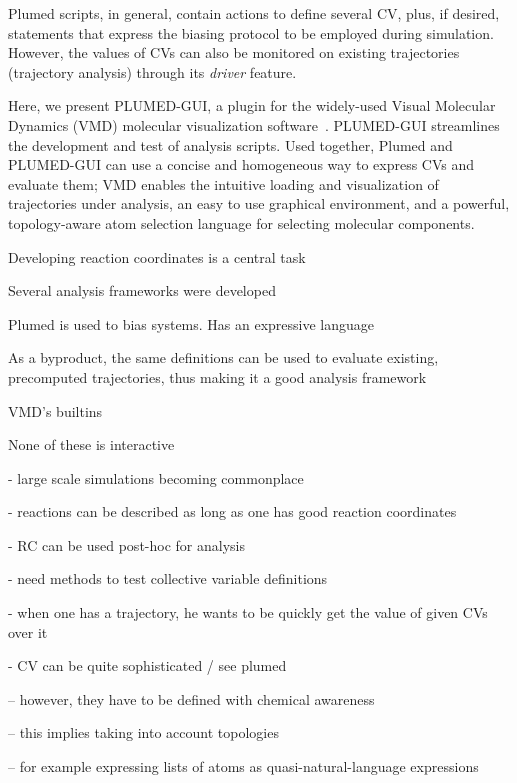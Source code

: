 \documentclass[preprint,12pt]{elsarticle}
\begin{document}
Plumed scripts, in general, contain actions to define several CV,
plus, if desired, statements that express the biasing protocol to be
employed during simulation. However, the values of CVs can also
be monitored on existing trajectories (trajectory analysis) through
its \emph{driver}  feature.

Here, we present PLUMED-GUI, a plugin for the widely-used Visual
Molecular Dynamics (VMD) molecular visualization
software~\cite{Humphrey_Dalke_Schulten_1996}.  PLUMED-GUI streamlines
the development and test of analysis scripts. Used together, Plumed
and PLUMED-GUI can use a concise and homogeneous way to express CVs
and evaluate them; VMD enables the intuitive loading and visualization
of trajectories under analysis, an easy to use graphical environment, 
and a powerful, topology-aware atom selection language for selecting
molecular components.





Developing reaction coordinates is a central task

Several analysis frameworks were developed

Plumed is used to bias systems. Has an expressive language 

As a byproduct, the same definitions can be used to evaluate
existing, precomputed trajectories, thus making it  a good analysis
framework


VMD's builtins

None of these is interactive







- large scale simulations becoming commonplace

- reactions can be described as long as one has good reaction coordinates

- RC can be used post-hoc for analysis

- need methods to test collective variable definitions

- when one has a trajectory, he wants to be quickly get the value of given CVs over it

- CV can be quite sophisticated / see plumed 

-- however, they have to be defined with chemical awareness

-- this implies taking into account topologies

-- for example expressing lists of atoms as quasi-natural-language expressions
\end{document}
